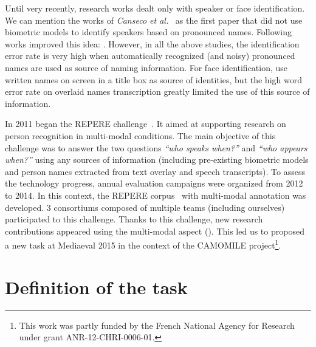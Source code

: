 \documentclass{acm_proc_article-me}
\begin{document}
Until very recently, research works dealt only with speaker or face identification. We can mention the works of \textit{Canseco et al.}~\cite{CANSECO--ASRU--2005, CANSECO--INTERSPEECH--2004} as the first paper that did not use biometric models to identify speakers based on pronounced names. Following works improved this idea: \cite{ESTEVE--INTERSPEECH--2007, JOUSSE--ICCASP--2009, MAUCLAIR--Odyssey--2006, TRANTER--ICASSP--2006}. However, in all the above studies, the identification error rate is very high when automatically recognized (and noisy) pronounced names are used as source of naming information. For face identification, \cite{HOUGHTON--IS--1999, SATOH--IEEEMM--1999, YANG--ACMMM--2004, YANG--ACMMM--2005}  use written names on screen in a title box as source of identities, but the high word error rate on overlaid names transcription greatly limited the use of this source of information.

In 2011 began the REPERE challenge~\cite{BERNARD--SLAM--2013, KAHN--CBMI--2012}. It aimed at supporting research on person recognition in multi-modal conditions. The main objective of this challenge was to answer the two questions \emph{``who speaks when?''} and \emph{``who appears when?''} using any sources of information (including pre-existing biometric models and person names extracted from text overlay and speech transcripts). To assess the technology progress, annual evaluation campaigns were organized from 2012 to 2014. In this context, the REPERE corpus~\cite{GIRAUDEL--LREC--2012} with multi-modal annotation was developed. 3 consortiums composed of multiple teams (including ourselves) participated to this challenge. Thanks to this challenge, new research contributions appeared using the multi-modal aspect (\cite{BECHET--INTERSPEECH--2014, BENDRIS--CBMI--2013, BREDIN--ODYSSEY--2014, BREDIN--INTERSPEECH--2013, BREDIN--SLAM--2013, BREDIN--IJMIR--2014, FAVRE--SLAM--2013, GAY--CBMI--2014, POIGNANT--ASLP--2015, POIGNANT--SLAM--2013, POIGNANT--INTERSPEECH--2012, POIGNANT--MTAP--2015, ROUVIER--CBMI--2014}). This led us to proposed a new task at Mediaeval 2015 in the context of the CAMOMILE project\footnote{This work was partly funded by the French National Agency for Research under grant ANR-12-CHRI-0006-01.}.



\section{Definition of the task}
\end{document}
